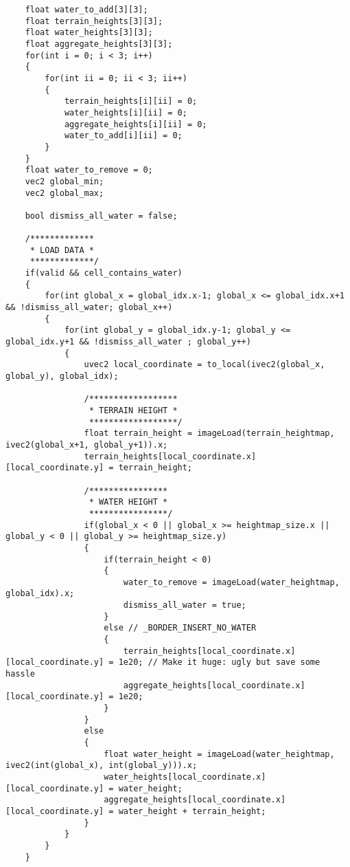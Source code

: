 \begin{verbatim}
    float water_to_add[3][3];
    float terrain_heights[3][3];
    float water_heights[3][3];
    float aggregate_heights[3][3];
    for(int i = 0; i < 3; i++)
    {
        for(int ii = 0; ii < 3; ii++)
        {
            terrain_heights[i][ii] = 0;
            water_heights[i][ii] = 0;
            aggregate_heights[i][ii] = 0;
            water_to_add[i][ii] = 0;
        }
    }
    float water_to_remove = 0;
    vec2 global_min;
    vec2 global_max;

    bool dismiss_all_water = false;

    /*************
     * LOAD DATA *
     *************/
    if(valid && cell_contains_water)
    {
        for(int global_x = global_idx.x-1; global_x <= global_idx.x+1 && !dismiss_all_water; global_x++)
        {
            for(int global_y = global_idx.y-1; global_y <= global_idx.y+1 && !dismiss_all_water ; global_y++)
            {
                uvec2 local_coordinate = to_local(ivec2(global_x, global_y), global_idx);

                /******************
                 * TERRAIN HEIGHT *
                 ******************/
                float terrain_height = imageLoad(terrain_heightmap, ivec2(global_x+1, global_y+1)).x;
                terrain_heights[local_coordinate.x][local_coordinate.y] = terrain_height;

                /****************
                 * WATER HEIGHT *
                 ****************/
                if(global_x < 0 || global_x >= heightmap_size.x || global_y < 0 || global_y >= heightmap_size.y)
                {
                    if(terrain_height < 0)
                    {
                        water_to_remove = imageLoad(water_heightmap, global_idx).x;
                        dismiss_all_water = true;
                    }
                    else // _BORDER_INSERT_NO_WATER
                    {
                        terrain_heights[local_coordinate.x][local_coordinate.y] = 1e20; // Make it huge: ugly but save some hassle
                        aggregate_heights[local_coordinate.x][local_coordinate.y] = 1e20;
                    }
                }
                else
                {
                    float water_height = imageLoad(water_heightmap, ivec2(int(global_x), int(global_y))).x;
                    water_heights[local_coordinate.x][local_coordinate.y] = water_height;
                    aggregate_heights[local_coordinate.x][local_coordinate.y] = water_height + terrain_height;
                }
            }
        }
    }


\end{verbatim}
